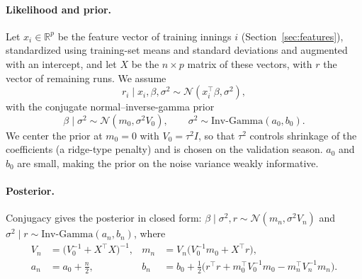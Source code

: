 \documentclass{article}
\newcommand{\1}{\mathbf{1}}
\begin{document}
\paragraph{Likelihood and prior.} Let $x_i \in \mathbb{R}^p$ be the feature vector of training innings $i$ (Section~\ref{sec:features}), standardized using training-set means and standard deviations and augmented with an intercept, and let $X$ be the $n \times p$ matrix of these vectors, with $r$ the vector of remaining runs. We assume
\begin{equation}
r_i \mid x_i, \beta, \sigma^2 \sim \mathcal{N}(x_i^\top \beta, \sigma^2),
\end{equation}
with the conjugate normal--inverse-gamma prior \citep{bishop2006,gelman2013}
\begin{equation}
\beta \mid \sigma^2 \sim \mathcal{N}(m_0, \sigma^2 V_0), \qquad \sigma^2 \sim \text{Inv-Gamma}(a_0, b_0).
\end{equation}
We center the prior at $m_0 = 0$ with $V_0 = \tau^2 I$, so that $\tau^2$ controls shrinkage of the coefficients (a ridge-type penalty) and is chosen on the validation season. $a_0$ and $b_0$ are small, making the prior on the noise variance weakly informative.

\paragraph{Posterior.} Conjugacy gives the posterior in closed form: $\beta \mid \sigma^2, r \sim \mathcal{N}(m_n, \sigma^2 V_n)$ and $\sigma^2 \mid r \sim \text{Inv-Gamma}(a_n, b_n)$, where
\begin{equation}
\begin{aligned}
V_n &= \big(V_0^{-1} + X^\top X\big)^{-1}, & m_n &= V_n\big(V_0^{-1} m_0 + X^\top r\big), \\
a_n &= a_0 + \tfrac{n}{2}, & b_n &= b_0 + \tfrac12\big(r^\top r + m_0^\top V_0^{-1} m_0 - m_n^\top V_n^{-1} m_n\big).
\end{aligned}
\end{equation}
\end{document}
